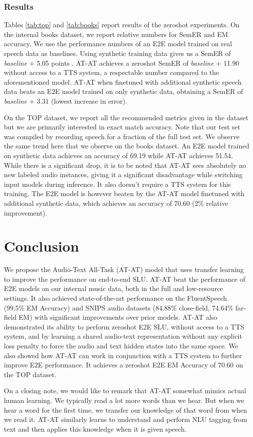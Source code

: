 \documentclass[letterpaper]{article} \usepackage{aaai21}  \usepackage{times}  \usepackage{helvet} \usepackage{courier}  \usepackage[hyphens]{url}  \usepackage{graphicx} \usepackage{booktabs}
\begin{document}
\subsubsection{Results}
Tables \ref{tab:top} and \ref{tab:books} report results of the zeroshot experiments. On the internal books dataset, we report relative numbers for SemER and EM accuracy. We use the performance numbers of an E2E model trained on real speech data as baselines. Using synthetic training data gives us a SemER of \emph{baseline} + 5.05 points . AT-AT achieves a zeroshot SemER of \emph{baseline} + 11.90 without access to a TTS system, a respectable number compared to the aforementioned model. AT-AT when finetuned with additional synthetic speech data beats an E2E model trained on only synthetic data, obtaining a SemER of \emph{baseline} + 3.31 (lowest increase in error).

On the TOP dataset, we report all the recommended metrics given in the dataset but we are primarily interested in exact match accuracy. Note that our test set was compiled by recording speech for a fraction of the full test set. We observe the same trend here that we observe on the books dataset. An E2E model trained on synthetic data achieves an accuracy of 69.19 while AT-AT achieves 51.54. While there is a significant drop, it is to be noted that AT-AT sees absolutely no new labeled audio instances, giving it a significant disadvantage while switching input models during inference. It also doesn't require a TTS system for this training. The E2E model is however beaten by the AT-AT model finetuned with additional synthetic data, which achieves an accuracy of 70.60 (2\% relative improvement).



\section{Conclusion}
We propose the Audio-Text All-Task (AT-AT) model that uses transfer learning to improve the performance on end-to-end SLU. AT-AT beat the performance of E2E models on our internal music data, both in the full and low-resource settings. It also achieved state-of-the-art performance on the FluentSpeech (99.5\% EM Accuracy) and SNIPS audio datasets (84.88\% close-field, 74.64\% far-field EM) with significant improvements over prior models. AT-AT also demonstrated its ability to perform zeroshot E2E SLU, without access to a TTS system, and by learning a shared audio-text representation without any explicit loss penalty to force the audio and text hidden states into the same space. We also showed how AT-AT can work in conjunction with a TTS system to further improve E2E performance. It achieves a zeroshot E2E EM Accuracy of 70.60 on the TOP dataset. 


On a closing note, we would like to remark that AT-AT somewhat mimics actual human learning. We typically read a lot more words than we hear. But when we hear a word for the first time, we transfer our knowledge of that word from when we read it. AT-AT similarly learns to understand and perform NLU tagging from text and then applies this knowledge when it is given speech.


\end{document}
